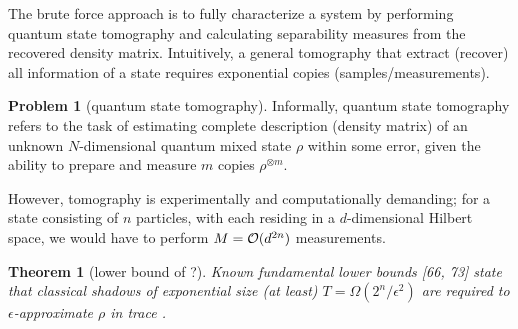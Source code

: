 \documentclass[
reprint,
aps,
pra,
]{revtex4-2}
\theoremstyle{plain}
\newtheorem{theorem}{Theorem}
\theoremstyle{definition}
\newtheorem{problem}{Problem}
\newcommand{\sx}{\hat{\sigma}_x}
\newcommand{\sy}{\hat{\sigma}_y}
\newcommand{\sz}{\hat{\sigma}_z}
\newcommand{\dm}{\rho}
\begin{document}
The brute force approach is to fully characterize a system by performing quantum state tomography and calculating separability measures from the recovered density matrix.
Intuitively, a general tomography \cite{altepeterPhotonicStateTomography2005} that extract (recover) all information of a state requires exponential copies (samples/measurements).
\begin{problem}[quantum state tomography]\label{prm:full_tomography}
	Informally, quantum state tomography refers to the task of estimating complete description (density matrix) of an unknown $N$-dimensional quantum mixed state $\dm$ within some error, 
	given the ability to prepare and measure $m$ copies $\dm^{\otimes m}$.
\end{problem}
However, tomography is experimentally and computationally demanding; for a state consisting of $n$ particles, with each residing in a $d$-dimensional Hilbert space, we would have to perform $M = \mathcal{O}(d^{2n})$ measurements.
\begin{theorem}[lower bound of ?\cite{haahSampleoptimalTomographyQuantum2017}]
	Known fundamental lower bounds [66, 73] state that classical shadows of exponential size (at least) $T = \Omega( 2^n / \epsilon^2)$ are required to $\epsilon$-approximate $\dm$ in trace .
\end{theorem}
\end{document}
